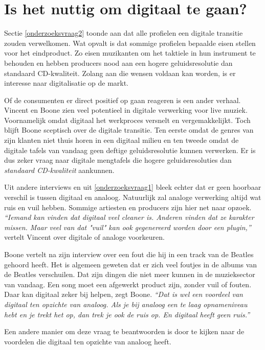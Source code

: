 \section{Is het nuttig om digitaal te gaan?}

Sectie \ref{onderzoeksvraag2} toonde aan dat alle profielen een digitale transitie zouden verwelkomen. Wat opvalt is dat sommige profielen bepaalde eisen stellen voor het eindproduct. Zo eisen muzikanten om het taktiele in hun instrument te behouden en hebben producers nood aan een hogere geluidsresolutie dan standaard CD-kwaliteit. Zolang aan die wensen voldaan kan worden, is er interesse naar digitalisatie op de markt.

Of de consumenten er direct positief op gaan reageren is een ander verhaal. Vincent en Boone zien veel potentieel in digitale verwerking voor live muziek. Voornamelijk omdat digitaal het werkproces versnelt en vergemakkelijkt. Toch blijft Boone sceptisch over de digitale transitie. Ten eerste omdat de genres van zijn klanten niet thuis horen in een digitaal milieu en ten tweede omdat de digitale tafels van vandaag geen deftige geluidsresolutie kunnen verwerken. Er is dus zeker vraag naar digitale mengtafels die hogere geluidsresoluties dan \textit{standaard CD-kwaliteit} \autocite{peterboone} aankunnen.

Uit andere interviews en uit \ref{onderzoeksvraag1} bleek echter dat er geen hoorbaar verschil is tussen digitaal en analoog. Natuurlijk zal analoge verwerking altijd wat ruis en vuil hebben. Sommige artiesten en producers zijn hier net naar opzoek. \textit{``Iemand kan vinden dat digitaal veel cleaner is. Anderen vinden dat ze karakter missen. Maar veel van dat "vuil" kan ook gegenereerd worden door een plugin,''} vertelt Vincent over digitale of analoge voorkeuren. \autocite{bartvincent} 

Boone vertelt na zijn interview over een fout die hij in een track van de Beatles gehoord heeft. Het is algemeen geweten dat er zich veel foutjes in de albums van de Beatles verschuilen. Dat zijn dingen die niet meer kunnen in de muzieksector van vandaag. Een song moet een afgewerkt product zijn, zonder vuil of fouten. Daar kan digitaal zeker bij helpen, zegt Boone. \textit{``Dat is wel een voordeel van digitaal ten opzichte van analoog. Als je bij analoog een te laag opnameniveau hebt en je trekt het op, dan trek je ook de ruis op. En digitaal heeft geen ruis.''} \autocite{peterboone}

Een andere manier om deze vraag te beantwoorden is door te kijken naar de voordelen die digitaal ten opzichte van analoog heeft.

